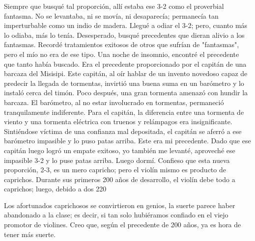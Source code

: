 Siempre que busqué tal proporción, allí estaba ese 3-2 como el proverbial fantasma. No se levantaba, ni se movía, ni desaparecía; permanecía tan imperturbable como un indio de madera. Llegué a odiar el 3-2; pero, cuanto más lo odiaba, más lo tenía. Desesperado, busqué precedentes que dieran alivio a los fantasmas. Recordé tratamientos exitosos de otros que sufrían de "fantasmas", pero el mío no era de ese tipo. Una noche de insomnio, encontré el precedente que tanto había buscado. Era el precedente proporcionado por el capitán de una barcaza del Misisipi. Este capitán, al oír hablar de un invento novedoso capaz de predecir la llegada de tormentas, invirtió una buena suma en un barómetro y lo instaló cerca del timón. Poco después, una gran tormenta amenazó con hundir la barcaza. El barómetro, al no estar involucrado en tormentas, permaneció tranquilamente indiferente. Para el capitán, la diferencia entre una tormenta de viento y una tormenta eléctrica con truenos y relámpagos era insignificante. Sintiéndose víctima de una confianza mal depositada, el capitán se aferró a ese barómetro impasible y lo puso patas arriba. Este era mi precedente. Dado que ese capitán luego logró un empate exitoso, yo también me levanté, aproveché ese impasible 3-2 y lo puse patas arriba.
Luego dormí.
Confieso que esta nueva proporción, 2-3, es un mero capricho; pero el violín mismo es producto de caprichos. Durante sus primeros 200 años de desarrollo, el violín debe todo a caprichos; luego, debido a dos
220

Los afortunados caprichosos se convirtieron en genios, la suerte parece haber abandonado a la clase; es decir, si tan solo hubiéramos confiado en el viejo promotor de violines. Creo que, según el precedente de 200 años, ya es hora de tener más suerte.
